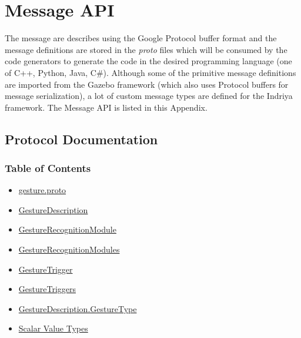 
\chapter{Message API} %

\label{AppendixC} %


The message are describes using the Google Protocol buffer format and the message definitions are stored in the \emph{proto} files which will be consumed by the code generators to generate the code in the desired programming language (one of C++, Python, Java, C\#). Although some of the primitive message definitions are imported from the Gazebo framework (which also uses Protocol buffers for message serialization), a lot of custom message types are defined for the Indriya framework. The Message API is listed in this Appendix.

\section{Protocol Documentation}\label{protocol-documentation}

\subsection{Table of Contents}\label{table-of-contents}

\begin{itemize}
\item
  \hyperref[gesture.proto]{gesture.proto}
\item
  \hyperref[experimot.msgs.GestureDescription]{GestureDescription}
\item
  \hyperref[experimot.msgs.GestureRecognitionModule]{GestureRecognitionModule}
\item
  \hyperref[experimot.msgs.GestureRecognitionModules]{GestureRecognitionModules}
\item
  \hyperref[experimot.msgs.GestureTrigger]{GestureTrigger}
\item
  \hyperref[experimot.msgs.GestureTriggers]{GestureTriggers}
\item
  \hyperref[experimot.msgs.GestureDescription.GestureType]{GestureDescription.GestureType}
\item
  \hyperref[scalar-value-types]{Scalar Value Types}
\end{itemize}

